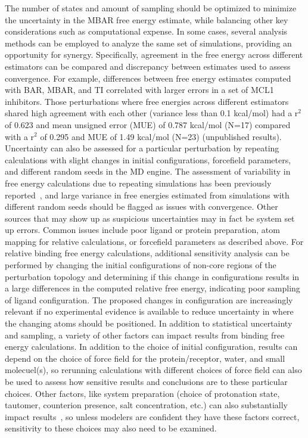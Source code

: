 \documentclass[9pt,bestpractices]{livecoms}
\begin{document}
The number of states and amount of sampling should be optimized to minimize the uncertainty in the MBAR free energy estimate, while balancing other key considerations such as computational expense. 
%
In some cases, several analysis methods can be employed to analyze the same set of simulations, providing an opportunity for synergy. Specifically, agreement in the free energy across different estimators can be compared and discrepancy between estimates used to assess convergence.
For example, differences between free energy estimates computed with BAR, MBAR, and TI correlated with larger errors in a set of MCL1 inhibitors.
Those perturbations where free energies across different estimators shared high agreement with each other (variance less than 0.1 kcal/mol) had a r$^2$ of 0.623 and mean unsigned error (MUE) of 0.787 kcal/mol (N=17) compared with a r$^2$ of 0.295 and MUE of 1.49 kcal/mol (N=23) (unpublished results).
%
Uncertainty can also be assessed for a particular perturbation by repeating calculations with slight changes in initial configurations, forcefield parameters, and different random seeds in the MD engine. 
The assessment of variability in free energy calculations due to repeating simulations has been previously reported~\cite{aldeghi2019accurate,paliwal2011benchmark,mey2016blinded,mey2018impact}, and large variance in free energies estimated from simulations with different random seeds should be flagged as issues with convergence. 
Other sources that may show up as suspicious uncertainties may in fact be system set up errors. Common issues include poor ligand or protein preparation, atom mapping for relative calculations, or forcefield parameters as described above.
%
For relative binding free energy calculations, additional sensitivity analysis can be performed by changing the initial configurations of non-core regions of the perturbation topology and determining if this change in configurations results in a large differences in the computed relative free energy, indicating poor sampling of ligand configuration.
The proposed changes in configuration are increasingly relevant if no experimental evidence is available to reduce uncertainty in where the changing atoms should be positioned.
%
In addition to statistical uncertainty and sampling, a variety of other factors can impact results from binding free energy calculations. In addition to the choice of initial configuration, results can depend on the choice of force field for the protein/receptor, water, and small molecuel(s), so rerunning calculations with different choices of force field can also be used to assess how sensitive results and conclusions are to these particular choices. Other factors, like system preparation (choice of protonation state, tautomer, counterion presence, salt concentration, etc.) can also substantially impact results~\cite{mobley2017predicting, mobley2017predictingb}, so unless modelers are confident they have these factors correct, sensitivity to these choices may also need to be examined.
%
\end{document}
